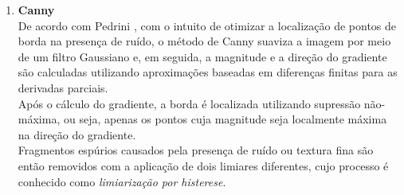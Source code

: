 \documentclass[12pt]{article}
\begin{document}
\begin{itemize}
\begin{itemize}
\begin{enumerate}[label*=\arabic*.]
    \item \textbf{Canny}\\
    De acordo com Pedrini \cite{pedrini2008analise}, com o intuito de otimizar a localização de pontos de borda na presença de ruído, o método de Canny suaviza a imagem por meio de um filtro Gaussiano e, em seguida, a magnitude e a direção do gradiente são calculadas utilizando aproximações baseadas em diferenças finitas para as derivadas parciais.\\
    Após o cálculo do gradiente, a borda é localizada utilizando supressão não-máxima, ou seja, apenas os pontos cuja magnitude seja localmente máxima na direção do gradiente.\\
    Fragmentos espúrios causados pela presença de ruído ou textura fina são então removidos com a aplicação de dois limiares diferentes, cujo processo é conhecido como \textit{limiarização por histerese}.
    \\
\end{enumerate}

\end{itemize}
\end{itemize}
\clearpage

\printbibliography
\end{document}
